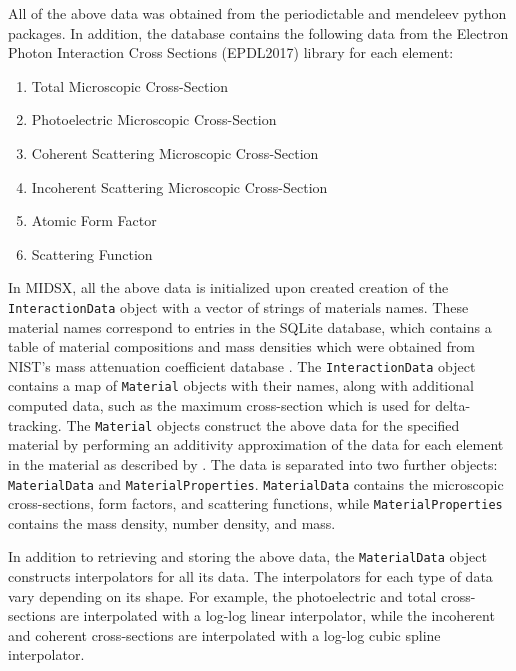All of the above data was obtained from the periodictable \cite{periodictable2022} and mendeleev \cite{mendeleev2021} python packages. In addition, the database contains the following data from the Electron Photon Interaction Cross Sections (EPDL2017) library \cite{cullen_survey_nodate} for each element:

\begin{enumerate}
    \item Total Microscopic Cross-Section
    \item Photoelectric Microscopic Cross-Section
    \item Coherent Scattering Microscopic Cross-Section
    \item Incoherent Scattering Microscopic Cross-Section
    \item Atomic Form Factor
    \item Scattering Function
\end{enumerate}

\par In MIDSX, all the above data is initialized upon created creation of the \texttt{InteractionData} object with a vector of strings of materials names. These material names correspond to entries in the SQLite database, which contains a table of material compositions and mass densities which were obtained from NIST's mass attenuation coefficient database \cite{hubbell_x-ray_2004}. The \texttt{InteractionData} object contains a map of \texttt{Material} objects with their names, along with additional computed data, such as the maximum cross-section which is used for delta-tracking. The \texttt{Material} objects construct the above data for the specified material by performing an additivity approximation of the data for each element in the material as described by \cite{HUSSEIN2007153}. The data is separated into two further objects: \texttt{MaterialData} and \texttt{MaterialProperties}. \texttt{MaterialData} contains the microscopic cross-sections, form factors, and scattering functions, while \texttt{MaterialProperties} contains the mass density, number density, and mass.
\par In addition to retrieving and storing the above data, the \texttt{MaterialData} object constructs interpolators for all its data. The interpolators for each type of data vary depending on its shape. For example, the photoelectric and total cross-sections are interpolated with a log-log linear interpolator, while the incoherent and coherent cross-sections are interpolated with a log-log cubic spline interpolator.


